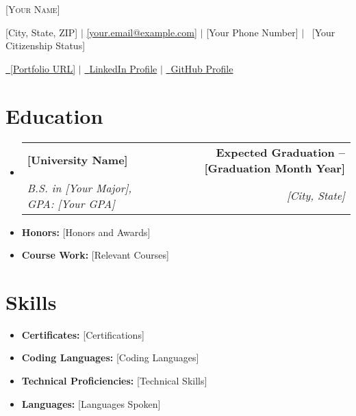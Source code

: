 \documentclass[11pt, letterpaper]{article} %
\makeatletter
\newcommand{\resumeSubheading}[4]{
  \vspace{0pt}\item %
    \begin{tabular*}{0.98\textwidth}[t]{l@{\extracolsep{\fill}}r}
      \textbf{#1} & \textbf{#2} \\ %
      \textit{\small #3} & \textit{\small #4} \\ %
    \end{tabular*}\vspace{-6pt}
}
\newcommand{\resumeListStart}{
  \begin{itemize}[leftmargin=0.1in, label={}] %
}
\newcommand{\resumeListEnd}{
  \end{itemize} \vspace{-6pt} %
}
\newcommand{\resumeItem}[1]{
  \item\small{#1 \vspace{-6pt}} %
}
\makeatother
\begin{document}
\begin{center}
    {\Huge \scshape [Your Name]} \vspace{5pt} %

    \faMapMarker \hspace{1pt} [City, State, ZIP] $|$ \hspace{1pt} 
    \faEnvelope \hspace{1pt} \href{mailto:[your.email@example.com]}{[your.email@example.com]} $|$ \hspace{1pt} 
    \faPhone \hspace{1pt} [Your Phone Number] $|$ \hspace{1pt} 
    \faPassport\ [Your Citizenship Status]
    
    \vspace{1pt}

    \href{[PORTFOLIO HYPERLINK]}{\faBriefcase\ [Portfolio URL]} $|$ \hspace{1pt}
    \href{[LinkedIn URL]}{\faLinkedin\ {LinkedIn Profile}} $|$ \hspace{1pt}
    \href{[GitHub URL]}{\faGithub\ {GitHub Profile}} 
\end{center}

\section{Education}
    \resumeListStart
        \resumeSubheading{[University Name]}{Expected Graduation -- [Graduation Month Year]}{B.S. in [Your Major], GPA: [Your GPA]}{[City, State]}
        \resumeItem{\textbf{Honors: }{[Honors and Awards]}}
        \resumeItem{\textbf{Course Work: }{[Relevant Courses]}}
    \resumeListEnd

\section{Skills}
\resumeListStart
    \resumeItem{\textbf{Certificates: }{[Certifications]}}
    \resumeItem{\textbf{Coding Languages: }{[Coding Languages]}}
    \resumeItem{\textbf{Technical Proficiencies: }{[Technical Skills]}}
    \resumeItem{\textbf{Languages: }{[Languages Spoken]}}
\resumeListEnd
\end{document}
